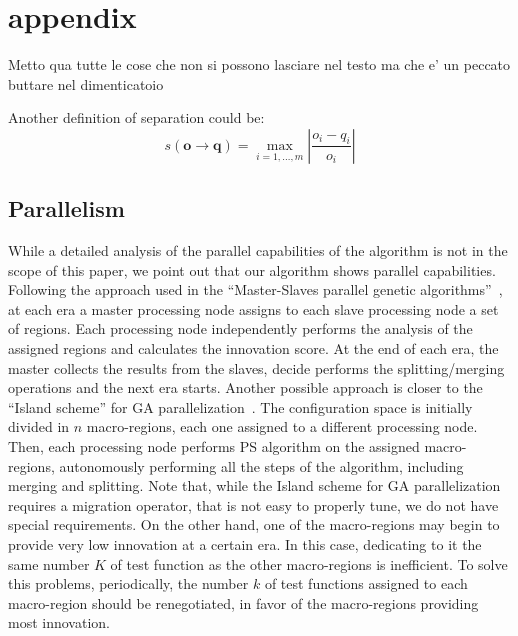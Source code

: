 \section{appendix}
Metto qua tutte le cose che non si possono lasciare nel testo ma che e' un peccato buttare nel dimenticatoio

\begin{definition} Another definition of separation could be:
	\[
	s\left(\mathbf{o}\rightarrow\mathbf{q}\right)=\max_{i=1,\dots,m}\left|\frac{o_{i}-q_{i}}{o_{i}}\right|
	\]
\end{definition}

\subsection{Parallelism}
While a detailed analysis of the parallel capabilities of the algorithm is not in the scope of this paper, we point out that our algorithm shows parallel capabilities. Following the approach used in the ``Master-Slaves parallel genetic algorithms''~\cite{Cantu-Paz98asurvey,Borkar14parallel}, at each era a master processing node assigns to each slave processing node a set of regions. Each processing node independently performs the analysis of the assigned regions and calculates the innovation score. At the end of each era, the master collects the results from the slaves, decide performs the splitting/merging operations and the next era starts. Another possible approach is closer to the ``Island scheme'' for GA parallelization~\cite{Borkar14parallel}. The configuration space is initially divided in $n$ macro-regions, each one assigned to a different processing node. Then, each processing node performs PS algorithm on the assigned macro-regions, autonomously performing all the steps of the algorithm, including merging and splitting. Note that, while the Island scheme for GA parallelization requires a migration operator, that is not easy to properly tune, we do not have special requirements. On the other hand, one of the macro-regions may begin to provide very low innovation at a certain era. In this case, dedicating to it the same number $K$ of test function as the other macro-regions is inefficient. To solve this problems, periodically, the number $k$ of test functions assigned to each macro-region should be renegotiated, in favor of the macro-regions providing most innovation.



